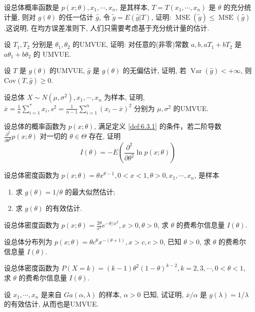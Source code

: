 \begin{xiti}
\item 设总体概率函数是 $p(x ; \theta), x_{1}, \cdots, x_{n}$, 是其样本, $T=T\left(x_{1}, \cdots, x_{n}\right)$ 是 $\theta$ 的充分统计量, 则对 $g(\theta)$ 的任一估计 $\hat{g}$, 令 $\tilde{g}=E(\hat{g}|T)$, 证明: $\operatorname{MSE}(\tilde{g})\leqslant\operatorname{MSE}(\hat{g})$.这说明, 在均方误差准则下, 人们只需要考虑基于充分统计量的估计.
\item 设 $T_1,T_2$ 分别是 $\theta_{1}, \theta_{2}$ 的UMVUE, 证明: 对任意的(非零)常数 $a, b, a T_{1}+b T_{2}$ 是 $a \theta_{1}+b \theta_{2}$ 的 UMVUE.
\item 设 $T$ 是 $g(\theta)$ 的UMVUE, $\hat{g}$ 是 $g(\theta)$ 的无偏估计, 证明, 若 $\operatorname{Var}(\hat{g})<+\infty$, 则 $\mathrm{Cov}(T,\hat{g})\geqslant0$.
\item 设总体 $X \sim N\left(\mu, \sigma^{2}\right), x_{1}, \cdots, x_{n}$ 为样本, 证明, $\overline{x}=\frac{1}{n} \sum_{i=1}^{*} x_{i}, s^{2}=\frac{1}{n-1} \sum_{i=1}^{n}\left(x_{i}-\overline{x}\right)^{2}$ 分别为 $\mu, \sigma^{2}$ 的UMVUE.
\item 设总体的概率函数为 $p(x ; \theta)$, 满足定义 \ref{def:6.3.1} 的条件，若二阶导数 $\frac{\partial^{2}}{\partial \theta^{2}} p(x ; \theta)$ 对一切的 $\theta \in \Theta$ 存在, 证明
\[I(\theta)=-E\left(\frac{\partial^{2}}{\partial \theta^{2}} \ln p(x ; \theta)\right)\]
\item 设总体密度函数为 $p(x ; \theta)=\theta x^{\theta-1}, 0<x<1, \theta>0, x_{1}, \cdots, x_{n}$, 是样本
  \begin{enumerate}
	\item 求 $g(\theta)=1 / \theta$ 的最大似然估计;
	\item 求 $g(\theta)$ 的有效估计.
  \end{enumerate}
\item 设总体密度函数为 $p\left(x;\theta\right)=\frac{2\theta}{x^{3}} e^{-\theta /x^{2}}, x>0, \theta>0$, 求 $\theta$ 的费希尔信息量 $I(\theta)$.
\item 设总体分布列为 $p(x;\theta)=\theta c^{\theta}x^{-(\theta+1)},x>c,c>0$, 已知 $\theta>0$, 求 $\theta$ 的费希尔信息量 $I(\theta)$.
\item 设总体密度函数为 $P(X=k)=(k-1) \theta^{2}(1-\theta)^{k-2}, k=2,3, \cdots, 0<\theta<1$, 求 $\theta$ 的费希尔信息量 $I(\theta)$.
\item 设 $x_{1}, \cdots, x_n$ 是来自 $G a(\alpha, \lambda)$ 的样本, $\alpha>0$ 已知, 试证明, $\overline{x} / \alpha$ 是 $g(\lambda)=1 / \lambda$ 的有效估计, 从而也是UMVUE.
\end{xiti}


